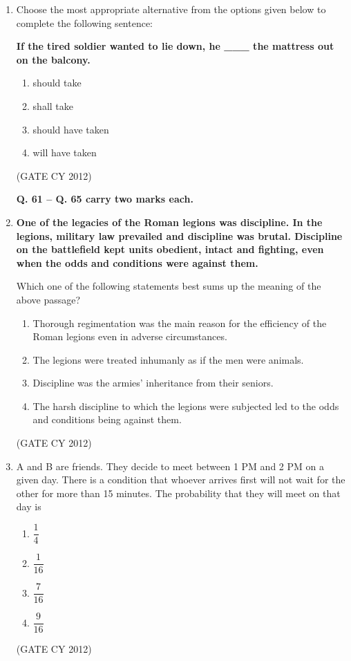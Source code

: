 \documentclass[12pt]{article}
\begin{document}
\begin{enumerate}
\item Choose the most appropriate alternative from the options given below to complete the following sentence:

\textbf{If the tired soldier wanted to lie down, he \_\_\_ the mattress out on the balcony.}

\begin{multicols}{2}
\begin{enumerate}
    \item should take
    \item shall take
    \item should have taken
    \item will have taken
\end{enumerate}
\end{multicols}
\hfill (GATE CY 2012)

\textbf{Q. 61 -- Q. 65 carry two marks each.}


\item \textbf{One of the legacies of the Roman legions was discipline. In the legions, military law prevailed and discipline was brutal. Discipline on the battlefield kept units obedient, intact and fighting, even when the odds and conditions were against them.}

Which one of the following statements best sums up the meaning of the above passage?

\begin{enumerate}
    \item Thorough regimentation was the main reason for the efficiency of the Roman legions even in adverse circumstances.
    \item The legions were treated inhumanly as if the men were animals.
    \item Discipline was the armies’ inheritance from their seniors.
    \item The harsh discipline to which the legions were subjected led to the odds and conditions being against them.
\end{enumerate}
\hfill (GATE CY 2012)

    \item A and B are friends. They decide to meet between 1 PM and 2 PM on a given day. There is a condition that whoever arrives first will not wait for the other for more than 15 minutes. The probability that they will meet on that day is
    \begin{multicols}{2}
        \begin{enumerate}
            \item $\dfrac{1}{4}$
            \item $\dfrac{1}{16}$
            \item $\dfrac{7}{16}$
            \item $\dfrac{9}{16}$
        \end{enumerate}
    \end{multicols}
    \hfill (GATE CY 2012)


\end{enumerate}
\end{document}
